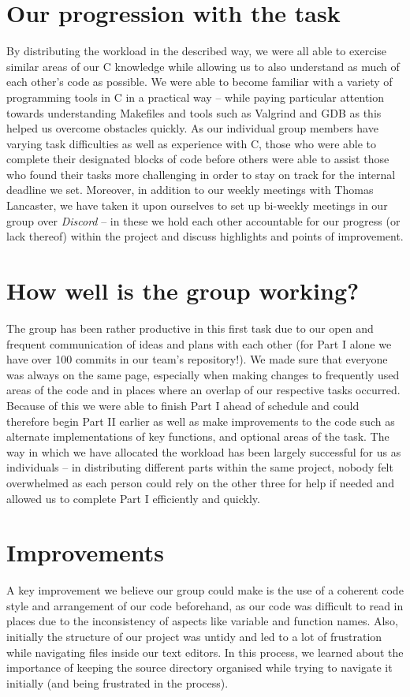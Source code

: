 \documentclass[10pt]{article}
\begin{document}
\section{Our progression with the task}
By distributing the workload in the described way, we were all able to exercise similar areas of our C knowledge while allowing us to also understand as much of each other's code as possible. We were able to become familiar with a variety of programming tools in C in a practical way -- while paying particular attention towards understanding Makefiles and tools such as Valgrind and GDB as this helped us overcome obstacles quickly.
As our individual group members have varying task difficulties as well as experience with C, those who were able to complete their designated blocks of code before others were able to assist those who found their tasks more challenging in order to stay on track for the internal deadline we set. Moreover, in addition to our weekly meetings with Thomas Lancaster, we have taken it upon ourselves to set up bi-weekly meetings in our group over \textit{Discord} -- in these we hold each other accountable for our progress (or lack thereof) within the project and discuss highlights and points of improvement.

\section{How well is the group working?}
The group has been rather productive in this first task due to our open and frequent communication of ideas and plans with each other (for Part I alone we have over 100 commits in our team's repository!). We made sure that everyone was always on the same page, especially when making changes to frequently used areas of the code and in places where an overlap of our respective tasks occurred. Because of this we were able to finish Part I ahead of schedule and could therefore begin Part II earlier as well as make improvements to the code such as alternate implementations of key functions, and optional areas of the task. 
The way in which we have allocated the workload has been largely successful for us as individuals -- in distributing different parts within the same project, nobody felt overwhelmed as each person could rely on the other three for help if needed and allowed us to complete Part I efficiently and quickly. 

\section{Improvements}
A key improvement we believe our group could make is the use of a coherent code style and arrangement of our code beforehand, as our code was difficult to read in places due to the inconsistency of aspects like variable and function names. Also, initially the structure of our project was untidy and led to a lot of frustration while navigating files inside our text editors. In this process, we learned about the importance of keeping the source directory organised while trying to navigate it initially (and being frustrated in the process). 
\end{document}
